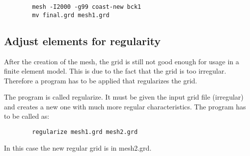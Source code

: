 \begin{verbatim}
        mesh -I2000 -g99 coast-new bck1
        mv final.grd mesh1.grd
\end{verbatim}

\subsection{Adjust elements for regularity}

After the creation of the mesh, the grid is still not good enough
for usage in a finite element model. This is due to the fact that
the grid is too irregular. Therefore a program has to be applied
that regularizes the grid.

The program is called regularize. It must be given the input grid file
(irregular) and creates a new one with much more regular characteristics.
The program has to be called as:

\begin{verbatim}
        regularize mesh1.grd mesh2.grd
\end{verbatim}

In this case the new regular grid is in mesh2.grd.

